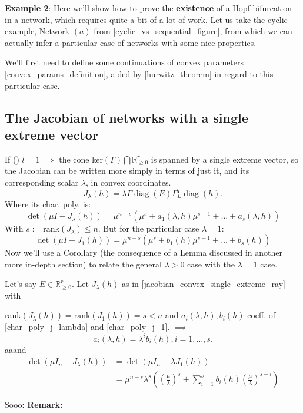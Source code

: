 \newpage
\textbf{Example 2}:
Here we'll show how to prove the \textbf{existence} of a Hopf bifurcation in a network, which requires quite a bit of a lot of work. Let us take the cyclic example, Network $(a)$ from \ref{cyclic_vs_sequential_figure}, from which we can actually infer a particular case of networks with some nice properties.

We'll first need to define some continuations of convex parameters \ref{convex_params_definition}, aided by \ref{hurwitz_theorem} in regard to this particular case.

\hfill\break
\subsection{The Jacobian of networks with a single extreme vector}\label{jacobian_single_extreme_vector}

If () $l = 1 \implies$ the cone ker$(\Gamma) \bigcap \mathbb{R}^r_{\geq 0}$ is spanned by a single extreme vector, so the Jacobian can be written more simply in terms of just it, and its corresponding scalar $\lambda$, in convex coordinates.
\begin{equation}\label{jacobian_convex_single_extreme_ray}
	J_\lambda(h)=\lambda \Gamma \operatorname{diag}(E)\Gamma_L^T\operatorname{diag}(h).
\end{equation}
Where its char. poly. is:
\begin{equation}\label{char_poly_j_lambda}
	\det(\mu I-J_\lambda(h))=\mu^{n-s}(\mu^s+a_1(\lambda,h)\mu^{s-1}+\ldots+a_s(\lambda,h))
\end{equation}
With $s := \text{rank}(J_\lambda) \leq n$.
But for the particular case $\lambda = 1$:
\begin{equation}\label{char_poly_j_1}
	\det(\mu I-J_1(h))=\mu^{n-s}(\mu^s+b_1(h)\mu^{s-1}+\ldots+b_s(h))
\end{equation}
Now we'll use a Corollary (the consequence of a Lemma discussed in another more in-depth section) to relate the general $\lambda > 0$ case with the $\lambda = 1$ case.
\begin{corollary}
	Let's say $E \in \mathbb{R}^r_{\geq 0}$. Let $J_\lambda(h)$ as in \ref{jacobian_convex_single_extreme_ray} with

	rank$(J_{\lambda}(h))=\mathrm{rank}(J_{1}(h))=s<n$ and $a_i(\lambda,h), b_i(h)$ coeff. of \ref{char_poly_j_lambda} and \ref{char_poly_j_1}. $\implies$
	\begin{equation}\label{colorally_jacobians_1st_satisfaction}
		a_i(\lambda,h)=\lambda^ib_i(h),i=1,\ldots,s.
	\end{equation}
	aaand
	\begin{equation}\label{colorally_jacobians_2nd_satisfaction}
		\begin{aligned}\det(\mu I_n-J_\lambda(h))&=\det(\mu I_n-\lambda J_1(h))\\&=\mu^{n-s}\lambda^s\left(\left(\frac{\mu}{\lambda}\right)^s+\sum_{i=1}^sb_i(h)\left(\frac{\mu}{\lambda}\right)^{s-i}\right)
		\end{aligned}
	\end{equation}
\end{corollary}
Sooo: \textbf{Remark: }


